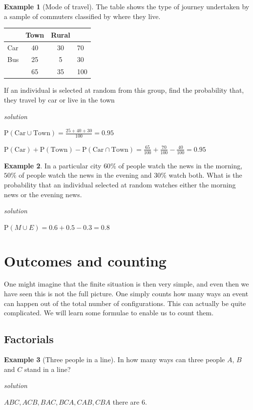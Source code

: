 \documentclass[
]{book}
\theoremstyle{definition}
\theoremstyle{definition}
\newtheorem{example}{Example}[chapter]
\theoremstyle{definition}
\theoremstyle{definition}
\theoremstyle{remark}
\begin{document}
\begin{example}[Mode of travel]
The table shows the type of journey undertaken by a sample of commuters classified by where they live.

\begin{longtable}[]{@{}lccl@{}}
\toprule
& Town & Rural &\tabularnewline
\midrule
\endhead
Car & 40 & 30 & 70\tabularnewline
Bus & 25 & 5 & 30\tabularnewline
& 65 & 35 & 100\tabularnewline
\bottomrule
\end{longtable}

If an individual is selected at random from this group, find the probability that, they travel by car or live in the town

\emph{solution}

\(\text{P}(\text{Car}\cup \text{Town}) = \frac{25+40+30}{100}=0.95\)

\(\text{P}(\text{Car})+ \text{P}(\text{Town})-\text{P}(\text{Car}\cap \text{Town})= \frac{65}{100}+\frac{70}{100}-\frac{40}{100} =0.95\)
\end{example}

\begin{example}
In a particular city \(60\%\) of people watch the news in the morning, \(50\%\) of people watch the news in the evening and \(30\%\) watch both. What is the probability that an individual selected at random watches either the morning news or the evening news.

\emph{solution}

\(\text{P}(M\cup E) = 0.6 + 0.5 - 0.3 = 0.8\)
\end{example}

\hypertarget{outcomes-and-counting}{%
\section{Outcomes and counting}\label{outcomes-and-counting}}

One might imagine that the finite situation is then very simple, and even then we have seen this is not the full picture. One simply counts how many ways an event can happen out of the total number of configurations. This can actually be quite complicated. We will learn some formulae to enable us to count them.

\hypertarget{factorials}{%
\subsection{Factorials}\label{factorials}}

\begin{example}[Three people in a line]
\protect\hypertarget{exm:three}{}\label{exm:three}In how many ways can three people \(A\), \(B\) and \(C\) stand in a line?

\emph{solution}

\(ABC, ACB, BAC, BCA, CAB,CBA\) there are \(6\).
\end{example}
\end{document}
